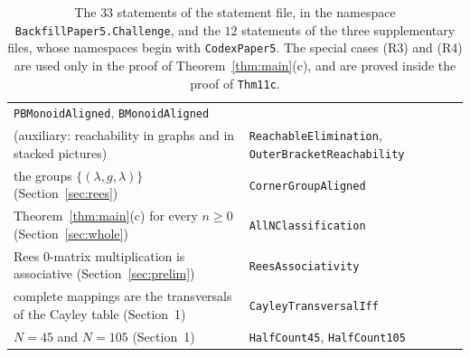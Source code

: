 \documentclass[11pt]{article}
\theoremstyle{remark}
\begin{document}
\begin{table}[ht]
\begin{tabular}{@{}>{\raggedright\arraybackslash}p{}
 >{\raggedright\arraybackslash}p{}@{}}
 \texttt{PBMonoidAligned}, \texttt{BMonoidAligned}\\
(auxiliary: reachability in graphs and in stacked pictures) & \texttt{ReachableElimination},
 \texttt{OuterBracketReachability}\\
the groups $\{(\lambda,g,\lambda)\}$ (Section~\ref{sec:rees}) &
 \texttt{CornerGroupAligned}\\
Theorem~\ref{thm:main}(c) for every $n\ge0$ (Section~\ref{sec:whole}) &
 \texttt{AllNClassification}\\
Rees $0$-matrix multiplication is associative (Section~\ref{sec:prelim}) &
 \texttt{ReesAssociativity}\\
complete mappings are the transversals of the Cayley table (Section~1) &
 \texttt{CayleyTransversalIff}\\
$N=45$ and $N=105$ (Section~1) & \texttt{HalfCount45}, \texttt{HalfCount105}\\\bottomrule
\end{tabular}
\caption{The $33$ statements of the statement file, in the namespace
\texttt{BackfillPaper5.Challenge}, and the $12$ statements of the three
supplementary files, whose namespaces begin with \texttt{CodexPaper5}. The special cases (R3) and (R4) are used
only in the proof of Theorem~\ref{thm:main}(c), and are proved inside the proof
of \texttt{Thm11c}.}\label{tab:lean}
\end{table}
\end{document}
